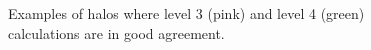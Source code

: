 \begin{figure}[!ht]
  \centering
  \hfill
  \caption{Examples of halos where level 3 (pink) and level 4 (green) calculations are in good agreement.}
  \label{fig:goodConvergence}
\end{figure}



